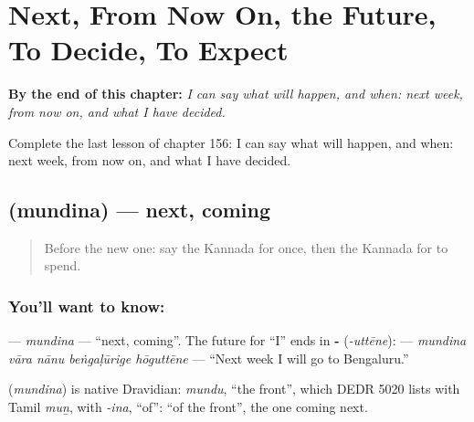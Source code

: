
\chapter{Next, From Now On, the Future, To Decide, To Expect}
\label{ch:ka-next-from-now-on-the-future-to-decide-to-expect}

\begin{chapteropening}
\textbf{By the end of this chapter:} \emph{I can say what will happen, and when: next week, from now on, and what I have decided.}

Complete the last lesson of chapter 156: I can say what will happen, and when: next week, from now on, and what I have decided.
\end{chapteropening}

\section[\texorpdfstring{\kn{ಮುಂದಿನ} (mundina)}{ಮುಂದಿನ (mundina)}]{ (mundina) — next, coming}

\label{lesson:KA-C156-mundina}



\begin{quote}
Before the new one: say the Kannada for once, then the Kannada for to spend.
\end{quote}

\subsection*{You'll want to know: }
\textbf{} — \emph{mundina} — \textquotedblleft{}next, coming\textquotedblright{}. The future for \textquotedblleft{}I\textquotedblright{} ends in \textbf{-} (\emph{-uttēne}): \textbf{    } — \emph{mundina vāra nānu beṅgaḷūrige hōguttēne} — \textquotedblleft{}Next week I will go to Bengaluru.\textquotedblright{}

\begin{cousinweb}
\textbf{} (\emph{mundina}) is native Dravidian: \emph{mundu}, \textquotedblleft{}the front\textquotedblright{}, which DEDR 5020 lists with Tamil \emph{muṉ}, with \emph{-ina}, \textquotedblleft{}of\textquotedblright{}: \textquotedblleft{}of the front\textquotedblright{}, the one coming next.
\end{cousinweb}

